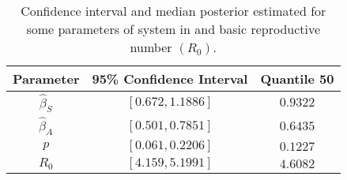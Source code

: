 \begin{table}[h!]
\begin{center}
	\begin{tabular}{ccc}
		\toprule
	    Parameter & 95\% Confidence Interval & Quantile 50
			\\
			\midrule
            $\hat{\beta}_S$ & $[0.672, 1.1886]$   &  $0.9322$ \\
            $\hat{\beta}_A$ & $[0.501, 0.7851]$  &  $0.6435$ \\
            $p$       & $[0.061, 0.2206]$ &  $0.1227$ \\
            $R_0$ & $[4.159, 5.1991]$ &  $4.6082$ \\
			\bottomrule
	\end{tabular}
  \caption{Confidence interval and median posterior estimated for some
  parameters of system in  and basic reproductive
  number $(R_0)$.}\label{table_icparam}
\end{center}
\end{table}


